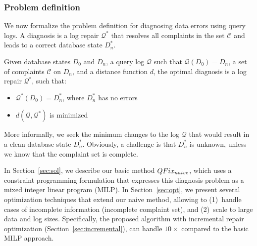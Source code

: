 \subsubsection*{Problem definition}

We now formalize the problem definition for diagnosing data
errors using query logs. A diagnosis is a log repair
$\mathcal{Q}^*$ that resolves all complaints in the set $\mathcal{C}$
and leads to a correct database state $D_n^*$.

\begin{definition}\label{def:problem}
    Given database states $D_0$ and $D_n$, a query log $\mathcal{Q}$ such that $\mathcal{Q}(D_0)=D_n$, a set of complaints $\mathcal{C}$ on $D_n$,  and a distance function $d$, the optimal diagnosis is a log repair $\mathcal{Q}^*$, such that:
    \begin{itemize}[itemsep=0pt, parsep=0pt]
        \item $\mathcal{Q}^*(D_0)=D_n^*$, where $D_n^*$ has no errors
        \item $d(\mathcal{Q}, \mathcal{Q}^*)$ is minimized
    \end{itemize}
\end{definition}

More informally, we seek the minimum changes to the log $\mathcal{Q}$
that would result in a clean database state $D_n^*$. Obviously, a
challenge is that $D_n^*$ is unknown, unless we know that the
complaint set is complete. 

In Section~\ref{sec:sol}, we describe our basic method $QFix_{naive}$, 
which
uses a constraint programming formulation that expresses this
diagnosis problem as a mixed integer linear program (MILP). 
In Section~\ref{sec:opt}, we present several optimization
techniques that extend our naive method, allowing \sys to (1)~handle
cases of incomplete information (incomplete complaint set), and
(2)~scale to large data and log sizes. Specifically, the proposed \sys algorithm with incremental
repair optimization (Section~\ref{sec:incremental}), can
handle $10\times$ compared to the basic MILP approach.




